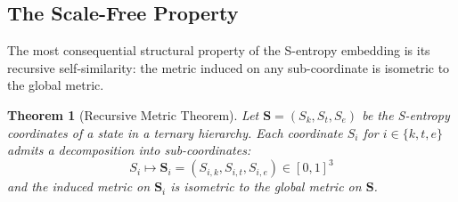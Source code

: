 \documentclass[12pt,twocolumn]{article}
\newtheorem{theorem}{Theorem}[section]
\begin{document}
\subsection{The Scale-Free Property}

The most consequential structural property of the S-entropy embedding is its recursive self-similarity: the metric induced on any sub-coordinate is isometric to the global metric.

\begin{theorem}[Recursive Metric Theorem]
\label{thm:recursive_metric}
Let $\mathbf{S} = (S_k, S_t, S_e)$ be the S-entropy coordinates of a state in a ternary hierarchy. Each coordinate $S_i$ for $i \in \{k, t, e\}$ admits a decomposition into sub-coordinates:
\begin{equation}
\label{eq:recursive}
S_i \mapsto \mathbf{S}_i = (S_{i,k}, S_{i,t}, S_{i,e}) \in [0,1]^3
\end{equation}
and the induced metric on $\mathbf{S}_i$ is isometric to the global metric on $\mathbf{S}$.
\end{theorem}
\end{document}
